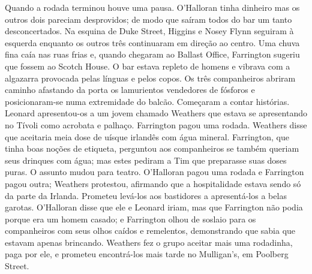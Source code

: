 Quando a rodada terminou houve uma pausa.  O’Halloran tinha dinheiro mas os
outros dois pareciam desprovidos; de modo que saíram todos do bar um tanto
desconcertados.  Na esquina de Duke Street, Higgins e Nosey Flynn seguiram à
esquerda enquanto os outros três continuaram em direção ao centro.  Uma chuva
fina caía nas ruas frias e, quando chegaram ao Ballast Office, Farrington
sugeriu que fossem ao Scotch House.  O bar estava repleto de homens e vibrava
com a algazarra provocada pelas línguas e pelos copos.  Os três companheiros
abriram caminho afastando da porta os lamurientos vendedores de fósforos e
posicionaram-se numa extremidade do balcão.  Começaram a contar histórias.
Leonard apresentou-os a um jovem chamado Weathers que estava se apresentando no
Tívoli como acrobata e palhaço.  Farrington pagou uma rodada.  Weathers disse
que aceitaria meia dose de uísque irlandês com água mineral.  Farrington, que
tinha boas noções de etiqueta, perguntou aos companheiros se também queriam
seus drinques com água; mas estes pediram a Tim que preparasse suas doses
puras.  O assunto mudou para teatro.  O’Halloran pagou uma rodada e Farrington
pagou outra; Weathers protestou, afirmando que a hospitalidade estava sendo só
da parte da Irlanda.  Prometeu levá-los aos bastidores a apresentá-los a belas
garotas.  O’Halloran disse que ele e Leonard iriam, mas que Farrington não
podia porque era um homem casado; e Farrington olhou de soslaio para os
companheiros com seus olhos caídos e remelentos, demonstrando que sabia que
estavam apenas brincando.  Weathers fez o grupo aceitar mais uma rodadinha,
paga por ele, e prometeu encontrá-los mais tarde no Mulligan’s, em Poolberg
Street.


